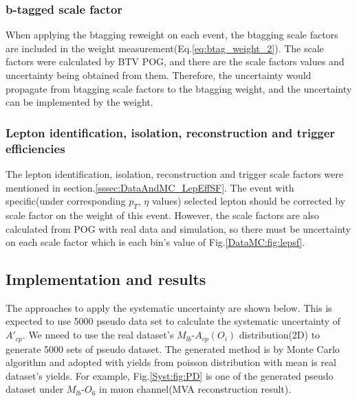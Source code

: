 		\subsubsection{b-tagged scale factor}
		\label{sssec:Syst_btag}

			When applying the btagging reweight on each event, the btagging scale factors are included in the weight measurement(Eq.\ref{eq:btag_weight_2}). The scale factors were calculated by BTV POG, and there are the scale factors values and uncertainty being obtained from them. Therefore, the uncertainty would propagate from btagging scale factors to the btagging weight, and the uncertainty can be implemented by the weight.

		\subsubsection{Lepton identification, isolation, reconstruction and trigger efficiencies}
		\label{sssec:Syst_lepsf}

			The lepton identification, isolation, reconstruction and trigger scale factors were mentioned in section.\ref{sssec:DataAndMC_LepEffSF}. The event with specific(under corresponding $p_T$, $\eta$ values) selected lepton should be corrected by scale factor on the weight of this event. However, the scale factors are also calculated from POG with real data and simulation, so there must be uncertainty on each scale factor which is each bin's value of Fig.\ref{DataMC:fig:lepsf}.

	\subsection{Implementation and results}
	\label{ssec:Syst_imp_result}

		The approaches to apply the systematic uncertainty are shown below. This is expected to use 5000 pseudo data set to calculate the systematic uncertainty of $A'_{cp}$. We nneed to use the real dataset's $M_{lb}$-$A_{cp}(O_i)$ distribution(2D) to generate 5000 sets of pseudo dataset. The generated method is by Monte Carlo algorithm and adopted with yields from poisson distribution with mean is real dataset's yields. For example, Fig.\ref{Syst:fig:PD} is one of the generated pseudo dataset under $M_{lb}$-$O_{6}$ in muon channel(MVA reconstruction result). 

